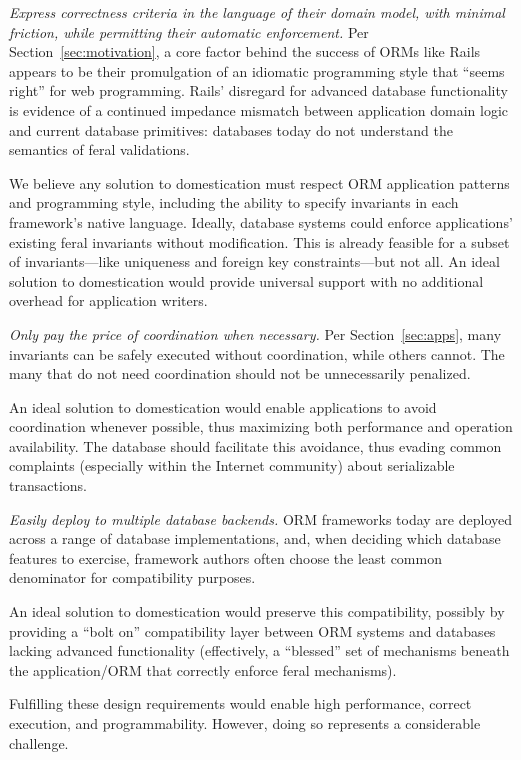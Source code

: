 \begin{interfaceenumerate} 
\item \textit{Express correctness criteria in the language of their
    domain model, with minimal friction, while permitting their
    automatic enforcement.} Per Section~\ref{sec:motivation}, a core
  factor behind the success of ORMs like Rails appears to be their
  promulgation of an idiomatic programming style that ``seems right''
  for web programming. Rails' disregard for advanced database
  functionality is evidence of a continued impedance mismatch between
  application domain logic and current database primitives: databases
  today do not understand the semantics of feral validations.
  \vspace{.25em}

  We believe any solution to domestication must respect ORM
  application patterns and programming style, including the ability to
  specify invariants in each framework's native language. Ideally,
  database systems could enforce applications' existing feral
  invariants without modification. This is already feasible for a
  subset of invariants---like uniqueness and foreign key
  constraints---but not all. An ideal solution to domestication would
  provide universal support with no additional overhead for
  application writers.

\item \textit{Only pay the price of coordination when necessary.} Per
  Section~\ref{sec:apps}, many invariants can be safely executed
  without coordination, while others cannot. The many that do not need
  coordination should not be unnecessarily penalized. \vspace{.25em}

  An ideal solution to domestication would enable applications to
  avoid coordination whenever possible, thus maximizing both
  performance and operation availability. The database should
  facilitate this avoidance, thus evading common complaints (especially
  within the Internet community) about serializable
  transactions.

\item \textit{Easily deploy to multiple database backends.}  ORM
  frameworks today are deployed across a range of database
  implementations, and, when deciding which database features to
  exercise, framework authors often choose the least common
  denominator for compatibility purposes.  \vspace{.25em}

  An ideal solution to domestication would preserve this
  compatibility, possibly by providing a ``bolt on'' compatibility layer
  between ORM systems and databases lacking advanced functionality
  (effectively, a ``blessed'' set of mechanisms beneath the
  application/ORM that correctly enforce feral mechanisms).

\end{interfaceenumerate}
Fulfilling these design requirements would enable high performance,
correct execution, and programmability. However, doing so represents a
considerable challenge.

